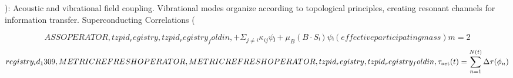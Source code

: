 
\begin{tzpsnapshot}
\end{tzpsnapshot}

): Acoustic and vibrational field coupling. Vibrational modes organize according to topological principles, creating resonant channels for information transfer. Superconducting Correlations (

\[
ASS OPERATOR,tzpid_registry,tzpid_registry_foldin,+ Σ_{j ≠ i} κ_{ij} ψⱼ + μ_B (B·Sᵢ) ψᵢ (effective participating mass) m = 2
\]
\[
registry_id_1309,METRIC REFRESH OPERATOR,METRIC REFRESH OPERATOR,tzpid_registry,tzpid_registry_foldin,\tau_{\rm net}(t) = \sum_{n=1}^{N(t)} \Delta \tau(\phi_n)
\]


